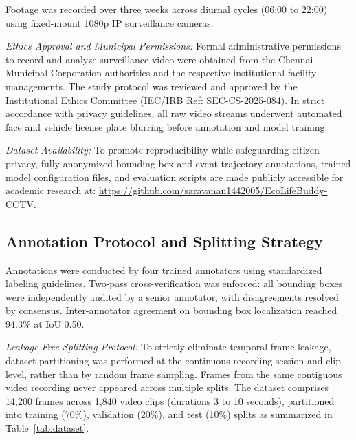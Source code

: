 \documentclass[conference]{IEEEtran}
\begin{document}
Footage was recorded over three weeks across diurnal cycles (06:00 to 22:00) using fixed-mount 1080p IP surveillance cameras.

\textit{Ethics Approval and Municipal Permissions:} Formal administrative permissions to record and analyze surveillance video were obtained from the Chennai Municipal Corporation authorities and the respective institutional facility managements. The study protocol was reviewed and approved by the Institutional Ethics Committee (IEC/IRB Ref: SEC-CS-2025-084). In strict accordance with privacy guidelines, all raw video streams underwent automated face and vehicle license plate blurring before annotation and model training.

\textit{Dataset Availability:} To promote reproducibility while safeguarding citizen privacy, fully anonymized bounding box and event trajectory annotations, trained model configuration files, and evaluation scripts are made publicly accessible for academic research at: \url{https://github.com/saravanan1442005/EcoLifeBuddy-CCTV}.

\subsection{Annotation Protocol and Splitting Strategy}

Annotations were conducted by four trained annotators using standardized labeling guidelines. Two-pass cross-verification was enforced: all bounding boxes were independently audited by a senior annotator, with disagreements resolved by consensus. Inter-annotator agreement on bounding box localization reached 94.3\% at IoU 0.50.

\textit{Leakage-Free Splitting Protocol:} To strictly eliminate temporal frame leakage, dataset partitioning was performed at the continuous recording session and clip level, rather than by random frame sampling. Frames from the same contiguous video recording never appeared across multiple splits. The dataset comprises 14,200 frames across 1,840 video clips (durations 3 to 10 seconds), partitioned into training (70\%), validation (20\%), and test (10\%) splits as summarized in Table~\ref{tab:dataset}.

\begin{table}[!t]
\centering
\caption{CCTV Cleanliness Dataset Distribution}
\label{tab:dataset}
\end{table}
\end{document}
